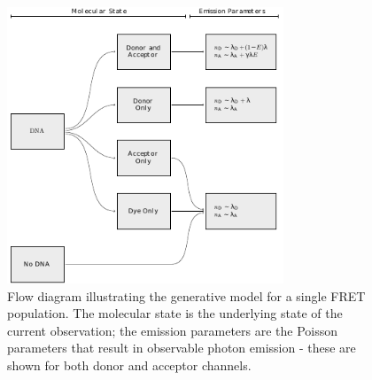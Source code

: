 \begin{figure}
   \begin{center}
      \includegraphics*[width=3.25in]{inference/fig2_model_flow_diagram.pdf}
      \caption{Flow diagram illustrating the generative model for a single FRET population.  The molecular state is the underlying state of the current observation; the emission parameters are the Poisson parameters that result in observable photon emission - these are shown for both donor and acceptor channels.}
      \label{fig:flow_single}
   \end{center}
\end{figure}


